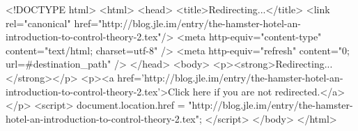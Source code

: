 <!DOCTYPE html>
<html>
<head>
<title>Redirecting...</title>
<link rel="canonical" href="http://blog.jle.im/entry/the-hamster-hotel-an-introduction-to-control-theory-2.tex"/>
<meta http-equiv="content-type" content="text/html; charset=utf-8" />
<meta http-equiv="refresh" content="0; url=#{destination_path}" />
</head>
<body>
  <p><strong>Redirecting...</strong></p>
  <p><a href='http://blog.jle.im/entry/the-hamster-hotel-an-introduction-to-control-theory-2.tex'>Click here if you are not redirected.</a></p>
  <script>
    document.location.href = "http://blog.jle.im/entry/the-hamster-hotel-an-introduction-to-control-theory-2.tex";
  </script>
</body>
</html>

